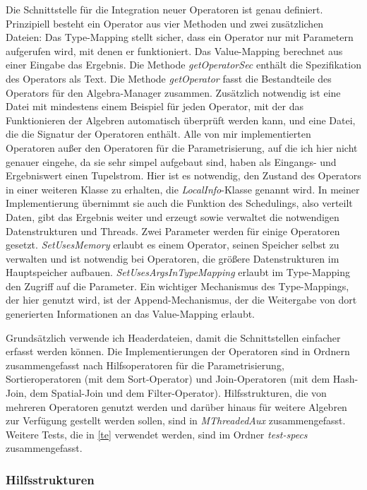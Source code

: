 \documentclass[a4paper,12pt,twoside]{article}
\newcommand{\Fb}[1]{\textit{#1}} %
\begin{document}
Die Schnittstelle für die Integration neuer Operatoren ist genau definiert. Prinzipiell besteht ein Operator aus vier Methoden und zwei zusätzlichen Dateien: Das Type-Mapping stellt sicher, dass ein Operator nur mit Parametern aufgerufen wird, mit denen er funktioniert. Das Value-Mapping berechnet aus einer Eingabe das Ergebnis. Die Methode \Fb{getOperatorSec} enthält die Spezifikation des Operators als Text. Die Methode \Fb{getOperator} fasst die Bestandteile des Operators für den Algebra-Manager zusammen. Zusätzlich notwendig ist eine Datei mit mindestens einem Beispiel für jeden Operator, mit der das Funktionieren der Algebren automatisch überprüft werden kann, und eine Datei, die die Signatur der Operatoren enthält. Alle von mir implementierten Operatoren außer den Operatoren für die Parametrisierung, auf die ich hier nicht genauer eingehe, da sie sehr simpel aufgebaut sind, haben als Eingangs- und Ergebniswert einen Tupelstrom. Hier ist es notwendig, den Zustand des Operators in einer weiteren Klasse zu erhalten, die \Fb{LocalInfo}-Klasse genannt wird. In meiner Implementierung übernimmt sie auch die Funktion des Schedulings, also verteilt Daten, gibt das Ergebnis weiter und erzeugt sowie verwaltet die notwendigen Datenstrukturen und Threads. Zwei Parameter werden für einige Operatoren gesetzt. \Fb{SetUsesMemory} erlaubt es einem Operator, seinen Speicher selbst zu verwalten und ist notwendig bei Operatoren, die größere Datenstrukturen im Hauptspeicher aufbauen. \Fb{SetUsesArgsInTypeMapping} erlaubt im Type-Mapping den Zugriff auf die Parameter. Ein wichtiger Mechanismus des Type-Mappings, der hier genutzt wird, ist der Append-Mechanismus, der die Weitergabe von dort generierten Informationen an das Value-Mapping erlaubt.

Grundsätzlich verwende ich Headerdateien, damit die Schnittstellen einfacher erfasst werden können. Die Implementierungen der Operatoren sind in Ordnern zusammengefasst nach Hilfsoperatoren für die Parametrisierung, Sortieroperatoren (mit dem Sort-Operator) und Join-Operatoren (mit dem Hash-Join, dem Spatial-Join und dem Filter-Operator). Hilfsstrukturen, die von mehreren Operatoren genutzt werden und darüber hinaus für weitere Algebren zur Verfügung gestellt werden sollen, sind in \Fb{MThreadedAux} zusammengefasst. Weitere Tests, die in \autoref{te} verwendet werden, sind im Ordner \Fb{test-specs} zusammengefasst.

\subsubsection{Hilfsstrukturen}
\label{Hilfsstrukturen} 
\end{document}
